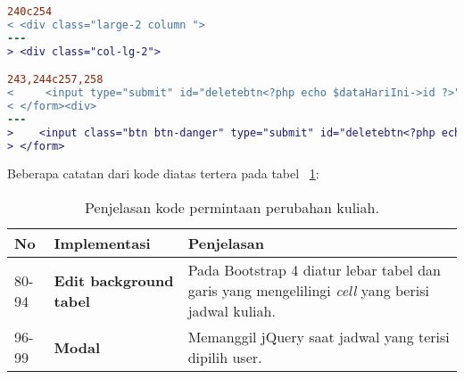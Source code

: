 \begin{lstlisting}[language=diff, caption=Kode untuk Halaman Entri Jadwal Dosen,  basicstyle=\ttfamily, frame=single,
columns=fullflexible, keepspaces=true, breaklines=true, label={lst:mainEntriJadwalDosen}]
240c254
< <div class="large-2 column ">
---
> <div class="col-lg-2">

243,244c257,258
<     <input type="submit" id="deletebtn<?php echo $dataHariIni->id ?>" name="deletebtn<?php echo $dataHariIni->id ?>" class="alert button" value="Delete">
< </form><div>
---
>    <input class="btn btn-danger" type="submit" id="deletebtn<?php echo $dataHariIni->id ?>" name="deletebtn<?php echo $dataHariIni->id ?>" value="Delete">
> </form>
\end{lstlisting}

Beberapa catatan dari kode diatas tertera pada tabel ~\ref{tabel:lst:entriJadwalDosen}:
\begin{table}[H]
	\centering
	\caption{Penjelasan kode permintaan perubahan kuliah.}
	\label{tabel:lst:entriJadwalDosen}
	\begin{tabularx}{\textwidth}{llX}
		\toprule
		No & Implementasi     & Penjelasan \\
		\midrule
		80-94 & \textbf{Edit background tabel}  & Pada Bootstrap 4 diatur lebar tabel dan garis yang mengelilingi \textit{cell} yang berisi jadwal kuliah.\\
		96-99 & \textbf{Modal}  & Memanggil jQuery saat jadwal yang terisi dipilih user.\\
		\bottomrule
	\end{tabularx}%
\end{table}


